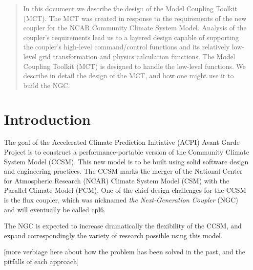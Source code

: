 \documentclass{article}
\begin{document}
\vspace*{\fill}


\newpage
\setcounter{page}{3}     %

\vspace*{\fill}

\begin{abstract}
In this document we describe the design of the Model Coupling
Toolkit (MCT).   The MCT was created in response to the requirements
of the new coupler for the NCAR Community Climate System Model.
Analysis of the coupler's requirements lead us to a layered
design capable of supporting the coupler's high-level
command/control functions and its relatively low-level grid
transformation and physics calculation functions.  The
Model Coupling Toolkit (MCT) is designed to handle the low-level
functions.  We describe in detail the
design of the MCT, and how one might use it to build the NGC.
\end{abstract}

\vspace*{\fill}
\newpage

\tableofcontents
\newpage



\section{Introduction}

The goal of the Accelerated Climate Prediction Initiative (ACPI)
Avant Garde Project is to construct a performance-portable
version of the Community Climate System Model (CCSM).  This new
model is to be built using solid software design and engineering
practices.  The CCSM marks the merger of the National Center for
Atmospheric Research (NCAR) Climate System Model (CSM) with the
Parallel Climate Model (PCM).   One of the chief design
challenges for the CCSM is the flux coupler, which was 
nicknamed {\em the Next-Generation Coupler} (NGC) and will
eventually be called cpl6.

The NGC is expected to increase dramatically the flexibility of
the CCSM, and expand correspondingly the variety of research
possible using this model.

[more verbiage here about how the problem has been solved in the
past, and the pitfalls of each approach]
\end{document}
